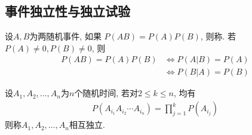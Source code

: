 \subsection{事件独立性与独立试验}
\begin{definition}
    设$A, B$为两随机事件, 如果 $P(AB)=P(A)P(B)$, 则称. 若$P(A)\ne 0, P(B)\ne 0$, 则
    \begin{align*}
        P(AB)=P(A)P(B)&\Longleftrightarrow P(A|B)=P(A)\\
        &\Longleftrightarrow P(B|A)=P(B)
    \end{align*}
\end{definition}
\begin{definition}
    设$A_1,A_2,\dots,A_n$为$n$个随机时间, 若对$2\le k \le n$, 均有
    \begin{align*}P(A_{i_1}A_{i_2}\cdots A_{i_n})=\prod_{j=1}^k P(A_{i_j})\end{align*}
    则称$A_1,A_2,\dots,A_n$相互独立. 
\end{definition}